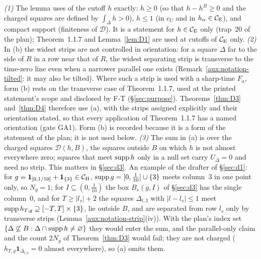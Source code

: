 \begin{auxrem}\label{aux:d2-uses}
\emph{(1)} The lemma uses of the cutoff $h$ exactly: $h\ge0$ (so that $h-h^B\ge0$ and the
charged squares are defined by $\int_\Delta h>0$), $h\le1$ (in $c_U$ and in $h_\alpha\in\mathcal{C}_{\mathrm E}$),
and compact support (finiteness of $\mathcal D$).  It is a statement for $h\in\mathcal{C}_{\mathrm E}$ only
(trap~20 of the plan); Theorem~1.1.7 and Lemma~\ref{lem:D1} are used at cutoffs of $\mathcal{C}_{\mathrm E}$ only.
\emph{(2)} In (b) the widest strips are not controlled in orientation: for a square $\Delta$
far to the side of $R$ in a row near that of $R$, the widest separating strip is transverse to
the time-zero line even when a narrower parallel one exists (Remark~\ref{aux:notation-tilted}:
it may also be tilted).  Where such a strip is used with a sharp-time $F_a$, form (b) rests on
the transverse case of Theorem~1.1.7, used at the printed statement's scope and disclosed by F-T
(\S\ref{sec:purpose}).  Theorems~\ref{thm:D3} and~\ref{thm:D4} therefore use (a), with the
strips assigned explicitly and their orientation stated, so that every application of
Theorem~1.1.7 has a named orientation (gate GA1).  Form (b) is recorded because it is a form of
the statement of the plan; it is not used below.
\emph{(3)} The sum in (a) is over the charged squares $\mathcal D(h,B)$, the squares outside $B$
on which $h$ is not almost everywhere zero; squares that meet $\operatorname{supp} h$ only in a null set carry
$U_\Delta=0$ and need no strip.  This matters in \S\ref{sec:d3}.  An example of the drafter of
\S\ref{sec:d1}: for $g=\mathbf 1_{[0,1/10]}+\mathbf 1_{\{3\}}\in\mathcal{C}_{\mathrm H}$, $\operatorname{supp} g=[0,\frac1{10}]\cup
\{3\}$ meets column~$3$ in one point only, so $N_g=1$; for $I\subseteq(0,\frac1{10})$ the box
$B_s(g,I)$ of \S\ref{sec:d3} has the single column~$0$, and for $T\ge|l_s|+2$ the squares
$\Delta_{l,3}$ with $|l-l_s|\le1$ meet $\operatorname{supp} h_{T,g}\supseteq[-T,T]\times\{3\}$, lie outside $B$,
and are separated from row $l_s$ only by transverse strips (Lemma~\ref{aux:notation-strip}(iv)).
With the plan's index set $\{\Delta\not\subseteq B:\Delta\cap\operatorname{supp} h\ne\varnothing\}$ they would
enter the sum, and the parallel-only claim and the count $2N_g$ of Theorem~\ref{thm:D3} would
fail; they are not charged ($h_{T,g}\mathbf 1_{\Delta_{l,3}}=0$ almost everywhere), so (a) omits
them.
\end{auxrem}
